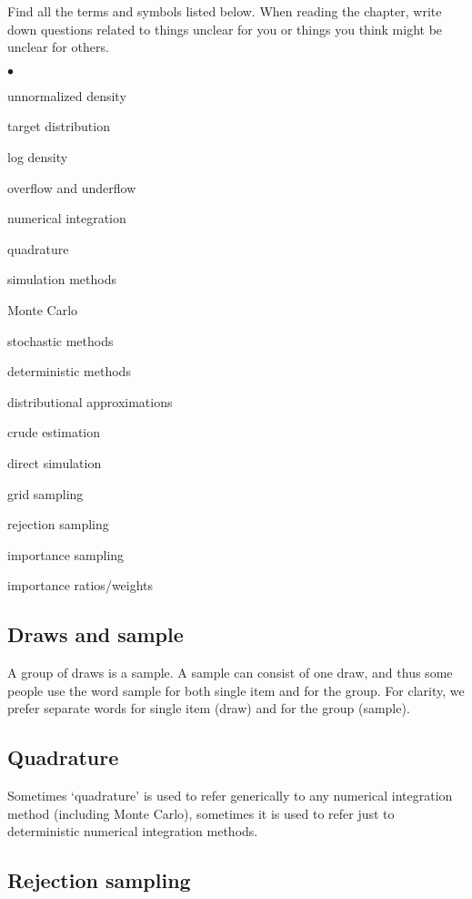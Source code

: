 \documentclass[a4paper,11pt,english]{article}
\begin{document}
Find all the terms and symbols listed below. When reading the chapter,
write down questions related to things unclear for you or things you
think might be unclear for others. 
\begin{list}{$\bullet$}{\parsep=0pt\itemsep=2pt}
\item unnormalized density
\item target distribution
\item log density
\item overflow and underflow
\item numerical integration
\item quadrature
\item simulation methods
\item Monte Carlo
\item stochastic methods
\item deterministic methods
\item distributional approximations
\item crude estimation
\item direct simulation
\item grid sampling
\item rejection sampling
\item importance sampling
\item importance ratios/weights
\end{list}

 \subsection*{Draws and sample}

 A group of draws is a sample. A sample can consist of one draw, and
 thus some people use the word sample for both single item and for the
 group. For clarity, we prefer separate words for single item (draw)
 and for the group (sample).
 
 \subsection*{Quadrature}

 Sometimes `quadrature' is used to refer generically to any numerical
 integration method (including Monte Carlo), sometimes it is used to
 refer just to deterministic numerical integration methods.

 \subsection*{Rejection sampling}
\end{document}
